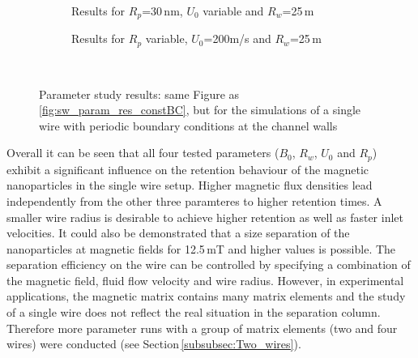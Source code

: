 \begin{figure}
\begin{subfigure}{0.49\textwidth}
                  \caption{Results for $R_{p}$=30\,nm, $U_{0}$ variable and $R_{w}$=25\,\textmu m}\label{subfig:sw_periodicBC_U0_var}
          \end{subfigure}\hfill
        \begin{subfigure}{0.49\textwidth}
                \flushright
                \caption{Results for $R_{p}$ variable, $U_{0}$=200\textmu m/s and $R_{w}$=25\,\textmu m}\label{subfig:sw_periodicBC_Rp_var}
        \end{subfigure}
        \\
        
        \caption[Parameter study results of the simulated retention of nanoparticles on a single wire with a periodic boundary condition at the channel walls]{Parameter study results: same Figure as \ref{fig:sw_param_res_constBC}, but for the simulations of a single wire with periodic boundary conditions at the channel walls}
        \label{fig:sw_param_res_periodicBC}
  \end{figure}

\FloatBarrier
Overall it can be seen that all four tested parameters ($B_{0}$, $R_{w}$, $U_{0}$ and $R_{p}$) exhibit a significant influence on the retention behaviour of the magnetic nanoparticles in the single wire setup. Higher magnetic flux densities lead independently from the other three paramteres to higher retention times. A smaller wire radius is desirable to achieve higher retention as well as faster inlet velocities. It could also be demonstrated that a size separation of the nanoparticles at magnetic fields for 12.5\,mT and higher values is possible. The separation efficiency on the wire can be controlled by specifying a combination of the magnetic field, fluid flow velocity and wire radius. However, in experimental applications, the magnetic matrix contains many matrix elements and the study of a single wire does not reflect the real situation in the separation column. Therefore more parameter runs with a group of matrix elements (two and four wires) were conducted (see Section\,\ref{subsubsec:Two_wires}).   

